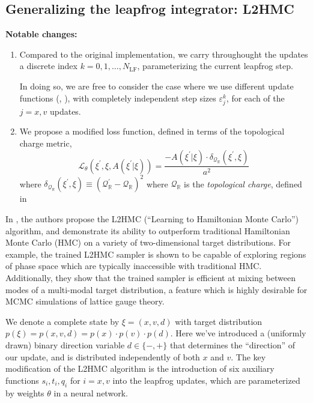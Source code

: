 \documentclass{article} %
\begin{document}
\subsection{\label{sec:l2hmc}Generalizing the leapfrog integrator: L2HMC}
%
\textbf{Notable changes:} 
\begin{enumerate}
   \item Compared to the original implementation, we carry throughought the updates a discrete index \(k = 0, 1, \ldots,
      N_{\mathrm{LF}}\), parameterizing the current leapfrog step.%

      In doing so, we are free to consider the case where we use different update functions
      (, ), with completely independent step sizes
      \(\varepsilon^{k}_{j}\), for each of the \(j = x, v\) updates.
   \item We propose a modified loss function, defined in terms of the topological charge metric,
      \begin{equation}
         \mathcal{L}_{\theta}{\left(\xi^{\prime},\xi,A(\xi^{\prime}|\xi)\right)} =
         \frac{-A(\xi^{\prime}|\xi)\cdot \delta_{\mathcal{Q}_{\mathbb{R}}}(\xi^{\prime}, \xi)}{a^{2}}
      \end{equation}
      where \(\delta_{\mathcal{Q}_{\mathbb{R}}}(\xi^{\prime}, \xi) \equiv%
      {(\mathcal{Q}_{\mathbb{R}}^{\prime} - \mathcal{Q}_{\mathbb{R}})}^{2}\) where \(\mathcal{Q}_{\mathbb{R}}\) is the
      \emph{topological charge}, defined in 
\end{enumerate}
%

In \citep{levy2017}, the authors propose the L2HMC (``Learning to Hamiltonian Monte Carlo'') algorithm, and demonstrate
its ability to outperform traditional Hamiltonian Monte Carlo (HMC) on a variety of two-dimensional target
distributions.
%
For example, the trained L2HMC sampler is shown to be capable of exploring regions of phase space which are typically
inaccessible with traditional HMC.\@
%
Additionally, they show that the trained sampler is efficient at mixing between modes of a multi-modal target
distribution, a feature which is highly desirable for MCMC simulations of lattice gauge theory.
%


We denote a complete state by \(\xi = (x, v, d)\) with target distribution \(p(\xi) = p(x, v, d) = p(x)\cdot p(v)\cdot
p(d)\).
%
Here we've introduced a (uniformly drawn) binary direction variable \(d\in\{-,+\}\) that determines the ``direction'' of
our update, and is distributed independently of both \(x\) and \(v\).
%
The key modification of the L2HMC algorithm is the introduction of six auxiliary functions \(s_{i}, t_{i}, q_{i}\) for \(i
= x, v\) into the leapfrog updates, which are parameterized by weights \(\theta\) in a neural network.
%
%
\end{document}
